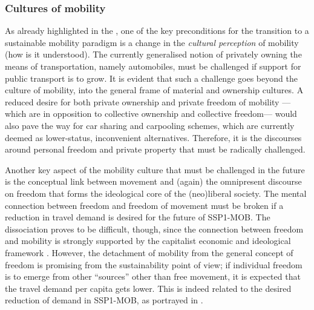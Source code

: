 \subsubsection*{Cultures of mobility}
As already highlighted in the , one of the key preconditions for the transition to a sustainable mobility paradigm is a change in the \emph{cultural perception} of mobility (how is it understood). The currently generalised notion of privately owning the means of transportation, namely automobiles, must be challenged if support for public transport is to grow. It is evident that such a challenge goes beyond the culture of mobility, into the general frame of material and ownership cultures. A reduced desire for both private ownership and private freedom of mobility ---which are in opposition to collective ownership and collective freedom--- would also pave the way for car sharing and carpooling schemes, which are currently deemed as lower-status, inconvenient alternatives. Therefore, it is the discourses around personal freedom and private property that must be radically challenged.

Another key aspect of the mobility culture that must be challenged in the future is the conceptual link between movement and (again) the omnipresent discourse on freedom that forms the ideological core of the (neo)liberal society. The mental connection between freedom and freedom of movement must be broken if a reduction in travel demand is desired for the future of SSP1-MOB. The dissociation proves to be difficult, though, since the connection between freedom and mobility is strongly supported by the capitalist economic and ideological framework \parencite{freudendal-pedersen2009_MobilityDailyLife,sheller2012_EmergenceNewCultures}. However, the detachment of mobility from the general concept of freedom is promising from the sustainability point of view; if individual freedom is to emerge from other ``sources'' other than free movement, it is expected that the travel demand per capita gets lower. This is indeed related to the desired reduction of demand in SSP1-MOB, as portrayed in .


